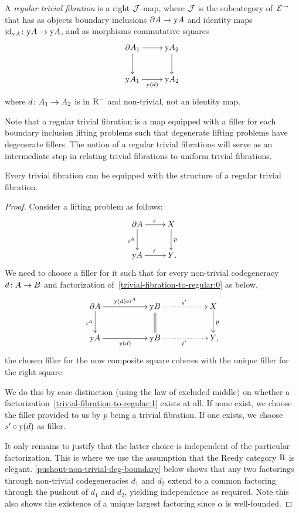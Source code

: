 \documentclass[reqno,10pt,a4paper,oneside,draft]{amsart}
\begin{document}
\begin{definition}
A \emph{regular trivial fibration} is a right $\cal{J}$-map, where $\cal{J}$ is the subcategory of~$\catE^{\to}$ that has as objects boundary inclusions $\partial A \to \yon A$ and identity maps $\id_{\yon A} \co \yon A \to \yon A$, and as morphisms commutative squares
\[
\xymatrix{
  \partial A_1
  \ar[r]
  \ar[d]
&
  \yon A_2
  \ar[d]
\\
  \yon A_1
  \ar[r]_{\yon(d)}
&
  \yon A_2
}
\]
where $d \co A_1 \to A_2$ is in $\Rm$ and non-trivial, \ie not an identity map.
\end{definition}

Note that a regular trivial fibration is a map equipped with a filler for each boundary inclusion lifting problems such that degenerate lifting problems have degenerate fillers.
The notion of a regular trivial fibrations will serve as an intermediate step in relating trivial fibrations to uniform trivial fibrations.

\begin{proposition} \label{trivial-fibration-to-regular}
Every trivial fibration can be equipped with the structure of a regular trivial fibration.
\end{proposition}

\begin{proof}
Consider a lifting problem as follows:
\begin{equation} \label{trivial-fibration-to-regular:0}
\xymatrix{
  \partial A
  \ar[d]_{i^A}
  \ar[r]^{s}
&
  X
  \ar[d]^{p}
\\
  \yon A
  \ar[r]^{t}
&
  Y
\rlap{.}}
\end{equation}
We need to choose a filler for it such that for every non-trivial codegeneracy $d \co A \to B$ and factorization of~\eqref{trivial-fibration-to-regular:0} as below,
\begin{equation} \label{trivial-fibration-to-regular:1}
\xymatrix@C+3em{
  \partial A
  \ar[r]^{\yon(d) \cc i^A}
  \ar[d]_{i^A}
&
  \yon B
  \ar@{.>}[r]^{s'}
  \ar@{=}[d]
&
  X
  \ar[d]^{p}
\\
  \yon A
  \ar[r]_{\yon(d)}
&
  \yon B
  \ar@{.>}[r]_{t'}
&
  Y
\rlap{,}}
\end{equation}
the chosen filler for the now composite square coheres with the unique filler for the right square.

We do this by case distinction (using the law of excluded middle) on whether a factorization~\eqref{trivial-fibration-to-regular:1} exists at all.
If none exist, we choose the filler provided to us by $p$ being a trivial fibration.
If one exists, we choose $s' \cc \yon(d)$ as filler.

It only remains to justify that the latter choice is independent of the particular factorization.
This is where we use the assumption that the Reedy category $\R$ is elegant.
\cref{pushout-non-trivial-deg-boundary} below shows that any two factorings through non-trivial codegeneracies $d_1$ and $d_2$ extend to a common factoring through the pushout of $d_1$ and $d_2$, yielding independence as required.
Note this also shows the existence of a unique largest factoring since $\alpha$ is well-founded.
\end{proof}
\end{document}
